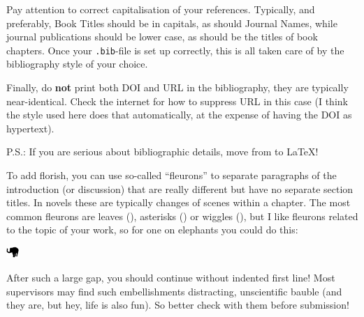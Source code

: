 \begin{boxmd}
	Pay attention to correct capitalisation of your references. Typically, and preferably, Book Titles should be in capitals, as should Journal Names, while journal publications should be lower case, as should be the titles of book chapters. Once your \texttt{.bib}-file is set up correctly, this is all taken care of by the bibliography style of your choice.
	
	Finally, do \textbf{not} print both DOI and URL in the bibliography, they are typically near-identical. Check the internet for how to suppress URL in this case (I think the style used here does that automatically, at the expense of having the DOI as hypertext).
	
	\noindent P.S.: If you are serious about bibliographic details, move from \BibTeX\/ to \LaTeX!
\end{boxmd}



To add florish, you can use so-called ``fleurons'' to separate paragraphs of the introduction (or discussion) that are really different but have no separate section titles. In novels these are typically changes of scenes within a chapter. The most common fleurons are leaves (\adfhangingflatleafright), asterisks () or wiggles (),
but I like fleurons related to the topic of your work, so for one on elephants you could do this: 

{\centering
	\includegraphics[width=0.5cm]{images/elephant.png}
	
}

\noindent After such a large gap, you should continue without indented first line! Most supervisors may find such embellishments distracting, unscientific bauble (and they are, but hey, life is also fun). So better check with them before submission!



